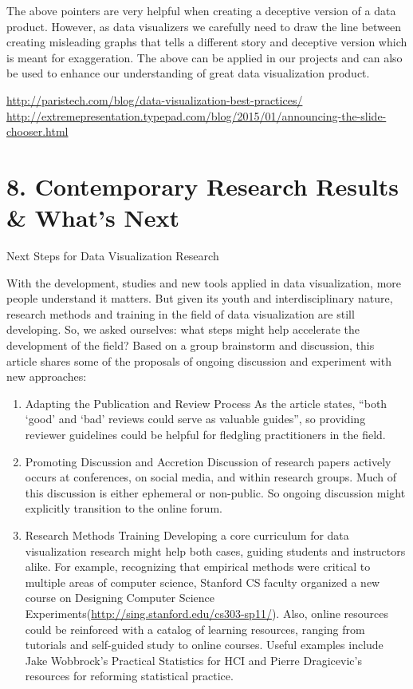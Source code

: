 \documentclass[]{book}
\theoremstyle{definition}
\theoremstyle{definition}
\theoremstyle{definition}
\theoremstyle{remark}
\begin{document}
The above pointers are very helpful when creating a deceptive version of
a data product. However, as data visualizers we carefully need to draw
the line between creating misleading graphs that tells a different story
and deceptive version which is meant for exaggeration. The above can be
applied in our projects and can also be used to enhance our
understanding of great data visualization product.

\url{http://paristech.com/blog/data-visualization-best-practices/}
\url{http://extremepresentation.typepad.com/blog/2015/01/announcing-the-slide-chooser.html}

\section{8. Contemporary Research Results \& What's
Next}\label{contemporary-research-results-whats-next}

Next Steps for Data Visualization Research

With the development, studies and new tools applied in data
visualization, more people understand it matters. But given its youth
and interdisciplinary nature, research methods and training in the field
of data visualization are still developing. So, we asked ourselves: what
steps might help accelerate the development of the field? Based on a
group brainstorm and discussion, this article shares some of the
proposals of ongoing discussion and experiment with new approaches:

\begin{enumerate}
\def\labelenumi{\arabic{enumi}.}
\item
  Adapting the Publication and Review Process As the article states,
  ``both `good' and `bad' reviews could serve as valuable guides'', so
  providing reviewer guidelines could be helpful for fledgling
  practitioners in the field.
\item
  Promoting Discussion and Accretion Discussion of research papers
  actively occurs at conferences, on social media, and within research
  groups. Much of this discussion is either ephemeral or non-public. So
  ongoing discussion might explicitly transition to the online forum.
\item
  Research Methods Training Developing a core curriculum for data
  visualization research might help both cases, guiding students and
  instructors alike. For example, recognizing that empirical methods
  were critical to multiple areas of computer science, Stanford CS
  faculty organized a new course on Designing Computer Science
  Experiments(\url{http://sing.stanford.edu/cs303-sp11/}). Also, online
  resources could be reinforced with a catalog of learning resources,
  ranging from tutorials and self-guided study to online courses. Useful
  examples include Jake Wobbrock's Practical Statistics for HCI and
  Pierre Dragicevic's resources for reforming statistical practice.
\end{enumerate}
\end{document}

